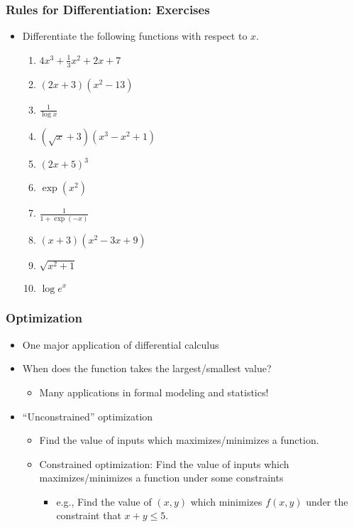 \documentclass[pdflatex, 12pt]{beamer}
\begin{document}
\begin{frame}
\frametitle{Rules for Differentiation: Exercises}
\begin{itemize}
\item Differentiate the following functions with respect to $x$.
 \begin{enumerate}
 \item $4x^3 + \frac{1}{3} x^2 + 2x + 7$
 \item $(2x + 3)(x^2 - 13)$
 \vspace{0.1cm}
 \item $\frac{1}{\log x}$
 \vspace{0.1cm}
 \item $(\sqrt{x} + 3)(x^3 - x^2 + 1)$
 \item $(2x + 5)^3$
 \item $\exp(x^2)$
 \vspace{0.1cm}
 \item $\frac{1}{1 + \exp(-x)}$
 \vspace{0.1cm}
 \item $(x + 3)(x^2 - 3x + 9)$
 \item $\sqrt{x^2 + 1}$
 \item $\log e^x$
 \end{enumerate}
\end{itemize}
\end{frame}

\begin{frame}
\frametitle{Optimization}
\begin{itemize}
\item One major application of differential calculus
\vspace{0.4cm}
\item When does the function takes the largest/smallest value?
 \begin{itemize}
 \item Many applications in formal modeling and statistics!
 \end{itemize}
\vspace{0.4cm}
\item ``Unconstrained'' optimization
 \begin{itemize}
 \item Find the value of inputs which maximizes/minimizes a function.
 \item Constrained optimization: Find the value of inputs which maximizes/minimizes a function under some constraints
  \begin{itemize}
  \item e.g., Find the value of $(x, y)$ which minimizes $f(x, y)$ under the constraint that $x + y \leq 5$.
  \end{itemize}
 \end{itemize}
\end{itemize}
\end{frame}
\end{document}
